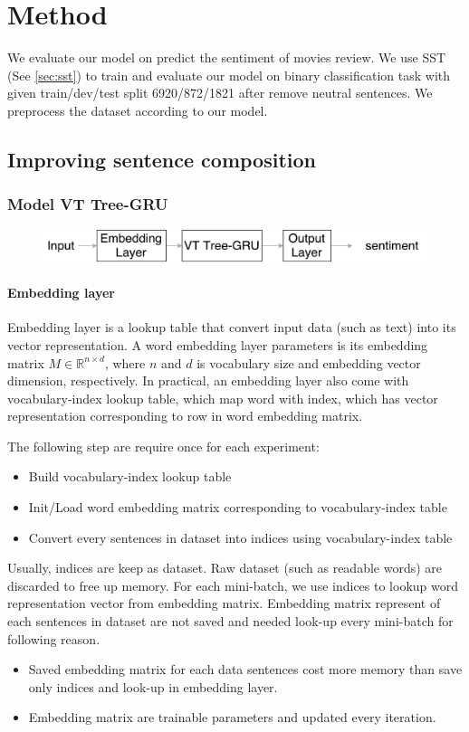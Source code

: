 \chapter{Method}
We evaluate our model on predict the sentiment of movies review. We use SST (See \ref{sec:sst}) to train and evaluate our model on binary classification task with given train/dev/test split 6920/872/1821 after remove neutral sentences. We preprocess the dataset according to our model.

\section{Improving sentence composition}

\subsection{Model VT Tree-GRU}\label{sec:VTtree}
\begin{figure}[H]
	\centering
	\includegraphics[width=0.8\linewidth]{figure/vtgrusummary.pdf}
	\caption[Convolution Tree LSTM]{}
	\label{fig:vtgrusummary}
\end{figure}

\subsubsection{Embedding layer}
Embedding layer is a lookup table that convert input data (such as text) into its vector representation. A word embedding layer parameters is its embedding matrix $M  \in \mathbb{R}^{n \times d}$, where $n$ and $d$ is vocabulary size and embedding vector dimension, respectively. In practical, an embedding layer also come with vocabulary-index lookup table, which map word with index, which has vector representation corresponding to row in word embedding matrix.
  
The following step are require once for each experiment:
\begin{itemize}
	\item Build vocabulary-index lookup table
	\item Init/Load word embedding matrix corresponding to vocabulary-index table
	\item Convert every sentences in dataset into indices using vocabulary-index table  
\end{itemize}
Usually, indices are keep as dataset. Raw dataset (such as readable words) are discarded to free up memory. For each mini-batch, we use indices to lookup word representation vector from embedding matrix. Embedding matrix represent of each sentences in dataset are not saved and needed look-up every mini-batch for following reason.
\begin{itemize}
	\item Saved embedding matrix for each data sentences cost more memory than save only indices and look-up in embedding layer.
	\item Embedding matrix are trainable parameters and updated every iteration.
\end{itemize}

